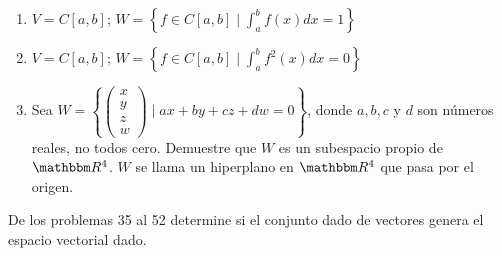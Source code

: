 \begin{enumerate}[resume]
    \item $V=C[a, b]$; $\displaystyle W=\left\{f \in C[a, b]\mid \int_{a}^{b} f(x) d x=1\right\}$
    \item $V=C[a, b]$; $\displaystyle W=\left\{f \in C[a, b]\mid \int_{a}^{b} f^{2}(x) d x=0\right\}$
    \item Sea $W=\left\{ \begin{pmatrix} x \\ y \\ z \\ w \end{pmatrix} \mid a x+b y+c z+d w=0\right\}$, donde $a, b, c$ y $d$ son números reales, no todos cero. Demuestre que $W$ es un subespacio propio de $\RR[4]$. $W$ se llama un hiperplano en $\RR[4]$ que pasa por el origen.
\end{enumerate}
De los problemas 35 al 52 determine si el conjunto dado de vectores genera el espacio vectorial dado.
